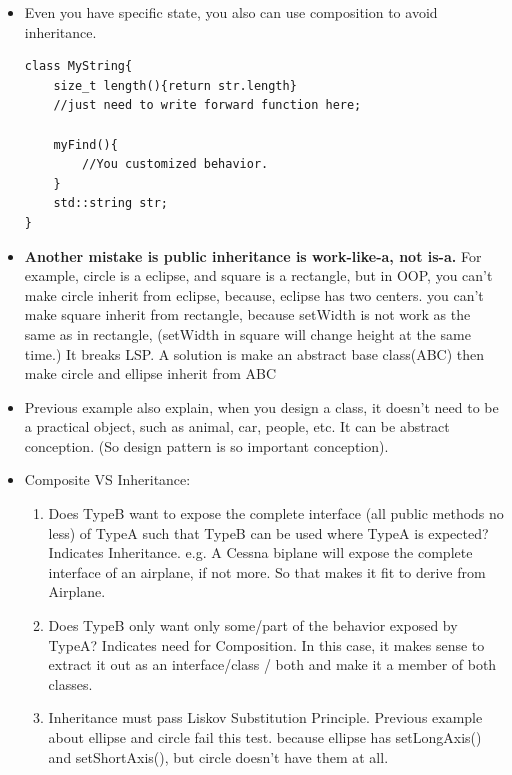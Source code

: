 \documentclass[a4paper,11pt,twoside]{book}
\begin{document}
\begin{itemize}
    \item Even you have specific state, you also can use composition to avoid inheritance.

\begin{lstlisting}[numbers=none]
class MyString{
	size_t length(){return str.length}
	//just need to write forward function here;
	
	myFind(){
		//You customized behavior.
	}	
	std::string str;
}
\end{lstlisting}
	
	\item \textbf{Another mistake is public inheritance is work-like-a, not is-a.} For example, circle is a eclipse, and square is a rectangle, but in OOP, you can't make circle inherit from eclipse, because, eclipse has two centers.  you can't make square inherit from rectangle, because setWidth is not work as the same as in rectangle, (setWidth in square will change height at the same time.) It breaks LSP.  A solution is make an abstract base class(ABC) then make circle and ellipse inherit from ABC
	
	\item Previous example also explain, when you design a class, it doesn't need to be a practical object, such as animal, car, people, etc.  It can be abstract conception.  (So design pattern is so important conception).
	
	\item Composite VS Inheritance:
	\begin{enumerate}
		\item Does TypeB want to expose the complete interface (all public methods no less) of TypeA such that TypeB can be used where TypeA is expected? Indicates Inheritance. e.g. A Cessna biplane will expose the complete interface of an airplane, if not more. So that makes it fit to derive from Airplane.
		
		\item Does TypeB only want only some/part of the behavior exposed by TypeA? Indicates need for Composition. In this case, it makes sense to extract it out as an interface/class / both and make it a member of both classes.
		
		\item Inheritance must pass Liskov Substitution Principle. Previous example about ellipse and circle fail this test. because ellipse has setLongAxis() and setShortAxis(), but circle doesn't have them at all.
	\end{enumerate}


\end{itemize}
\end{document}

